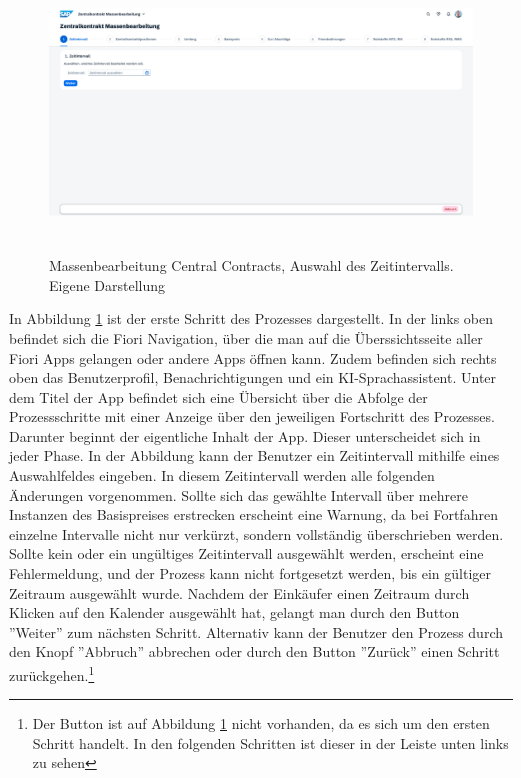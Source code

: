 \begin{figure}[H]
    \centering
    \includegraphics[height=7.37cm]{Bilder/Praxisteil-KL-Schritt-1.png}
    \caption[Massenbearbeitung Central Contracts, Auswahl des Zeitintervalls]{Massenbearbeitung Central Contracts, Auswahl des Zeitintervalls. Eigene Darstellung}
    \label{fig:PraxisKLSchritt1}
\end{figure}

In Abbildung \ref{fig:PraxisKLSchritt1} ist der erste Schritt des Prozesses dargestellt. In der links oben befindet sich die Fiori Navigation, über die man auf die Überssichtsseite aller Fiori Apps gelangen oder andere Apps öffnen kann. Zudem befinden sich rechts oben das Benutzerprofil, Benachrichtigungen und ein KI-Sprachassistent. Unter dem Titel der App befindet sich eine Übersicht über die Abfolge der Prozessschritte mit einer Anzeige über den jeweiligen Fortschritt des Prozesses. Darunter beginnt der eigentliche Inhalt der App. Dieser unterscheidet sich in jeder Phase. In der Abbildung kann der Benutzer ein Zeitintervall mithilfe eines Auswahlfeldes eingeben. In diesem Zeitintervall werden alle folgenden Änderungen vorgenommen. Sollte sich das gewählte Intervall über mehrere Instanzen des Basispreises erstrecken erscheint eine Warnung, da bei Fortfahren einzelne Intervalle nicht nur verkürzt, sondern vollständig überschrieben werden. Sollte kein oder ein ungültiges Zeitintervall ausgewählt werden, erscheint eine Fehlermeldung, und der Prozess kann nicht fortgesetzt werden, bis ein gültiger Zeitraum ausgewählt wurde. Nachdem der Einkäufer einen Zeitraum durch Klicken auf den Kalender ausgewählt hat, gelangt man durch den Button ''Weiter'' zum nächsten Schritt. Alternativ kann der Benutzer den Prozess durch den Knopf ''Abbruch'' abbrechen oder durch den Button ''Zurück'' einen Schritt zurückgehen.\footnote{Der Button ist auf Abbildung \ref{fig:PraxisKLSchritt1} nicht vorhanden, da es sich um den ersten Schritt handelt. In den folgenden Schritten ist dieser in der Leiste unten links zu sehen}

